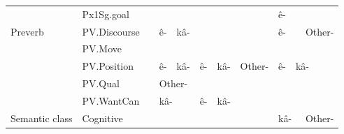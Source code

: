 \begin{table}[h!]
\begin{tabular}{@{}llllllllllll@{}}
               & Px1Sg.goal          &                                &                                     &              &                                          &                               &                                &                                   & \multicolumn{3}{l}{\cellcolor[HTML]{B6D7A8}ê-}                                              \\
Preverb        & PV.Discourse        &                                & \cellcolor[HTML]{B6D7A8}ê-       & \multicolumn{2}{l}{\cellcolor[HTML]{EA9999}kâ-}      &                               &                                &                                   & \multicolumn{2}{l}{\cellcolor[HTML]{B6D7A8}ê-}  & \cellcolor[HTML]{EA9999}Other-         \\
               & PV.Move             &                                &                                     &              &                                          &                               &                                &                                   &                                    &               &                                           \\
               & PV.Position         &                                & \cellcolor[HTML]{B6D7A8}ê-       & \multicolumn{2}{l}{\cellcolor[HTML]{EA9999}kâ-}      & \cellcolor[HTML]{B6D7A8}ê- & \cellcolor[HTML]{B6D7A8}kâ- & \cellcolor[HTML]{EA9999}Other- & \cellcolor[HTML]{B6D7A8}ê-      & \multicolumn{2}{l}{\cellcolor[HTML]{EA9999}kâ-}        \\
               & PV.Qual             &                                & \multicolumn{3}{l}{\cellcolor[HTML]{EA9999}Other-}                                         &                               &                                &                                   &                                    &               &                                           \\
               & PV.WantCan          &                                & \multicolumn{3}{l}{\cellcolor[HTML]{EA9999}kâ-}                                            & \cellcolor[HTML]{EA9999}ê- & \multicolumn{2}{l}{\cellcolor[HTML]{EA9999}kâ-}                 &                                    &               &                                           \\
Semantic class & Cognitive           &                                &                                     &              &                                          &                               &                                &                                   & \multicolumn{2}{l}{\cellcolor[HTML]{EA9999}kâ-} & \cellcolor[HTML]{B6D7A8}Other-         \\

\end{tabular}
\end{table}
